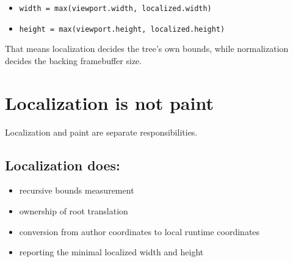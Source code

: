 \begin{itemize}
\tightlist
\item
  \texttt{w\allowbreak{}i\allowbreak{}d\allowbreak{}t\allowbreak{}h\allowbreak{} \allowbreak{}=\allowbreak{} \allowbreak{}m\allowbreak{}a\allowbreak{}x\allowbreak{}(\allowbreak{}v\allowbreak{}i\allowbreak{}e\allowbreak{}w\allowbreak{}p\allowbreak{}o\allowbreak{}r\allowbreak{}t\allowbreak{}.\allowbreak{}w\allowbreak{}i\allowbreak{}d\allowbreak{}t\allowbreak{}h\allowbreak{},\allowbreak{} \allowbreak{}l\allowbreak{}o\allowbreak{}c\allowbreak{}a\allowbreak{}l\allowbreak{}i\allowbreak{}z\allowbreak{}e\allowbreak{}d\allowbreak{}.\allowbreak{}w\allowbreak{}i\allowbreak{}d\allowbreak{}t\allowbreak{}h\allowbreak{})}
\item
  \texttt{h\allowbreak{}e\allowbreak{}i\allowbreak{}g\allowbreak{}h\allowbreak{}t\allowbreak{} \allowbreak{}=\allowbreak{} \allowbreak{}m\allowbreak{}a\allowbreak{}x\allowbreak{}(\allowbreak{}v\allowbreak{}i\allowbreak{}e\allowbreak{}w\allowbreak{}p\allowbreak{}o\allowbreak{}r\allowbreak{}t\allowbreak{}.\allowbreak{}h\allowbreak{}e\allowbreak{}i\allowbreak{}g\allowbreak{}h\allowbreak{}t\allowbreak{},\allowbreak{} \allowbreak{}l\allowbreak{}o\allowbreak{}c\allowbreak{}a\allowbreak{}l\allowbreak{}i\allowbreak{}z\allowbreak{}e\allowbreak{}d\allowbreak{}.\allowbreak{}h\allowbreak{}e\allowbreak{}i\allowbreak{}g\allowbreak{}h\allowbreak{}t\allowbreak{})}
\end{itemize}

That means localization decides the tree's own bounds, while normalization decides the backing framebuffer size.

\section{Localization is not paint}\label{record-049-localization-is-not-paint}

Localization and paint are separate responsibilities.

\subsection{Localization does:}\label{record-049-localization-does}

\begin{itemize}
\tightlist
\item
  recursive bounds measurement
\item
  ownership of root translation
\item
  conversion from author coordinates to local runtime coordinates
\item
  reporting the minimal localized width and height
\end{itemize}


